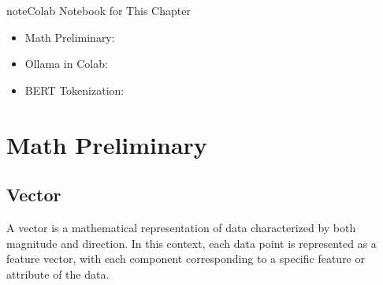 \documentclass[letterpaper,11pt,english]{sphinxmanual}
\begin{document}
\begin{sphinxadmonition}{note}{Colab Notebook for This Chapter}
\begin{itemize}
\item {} 
\sphinxAtStartPar
Math Preliminary: 

\item {} 
\sphinxAtStartPar
Ollama in Colab: 

\item {} 
\sphinxAtStartPar
BERT Tokenization: 

\end{itemize}
\end{sphinxadmonition}


\section{Math Preliminary}
\label{\detokenize{prelim:math-preliminary}}

\subsection{Vector}
\label{\detokenize{prelim:vector}}
\sphinxAtStartPar
A vector is a mathematical representation of data characterized by both magnitude and
direction. In this context, each data point is represented as a feature vector, with
each component corresponding to a specific feature or attribute of the data.
\end{document}
